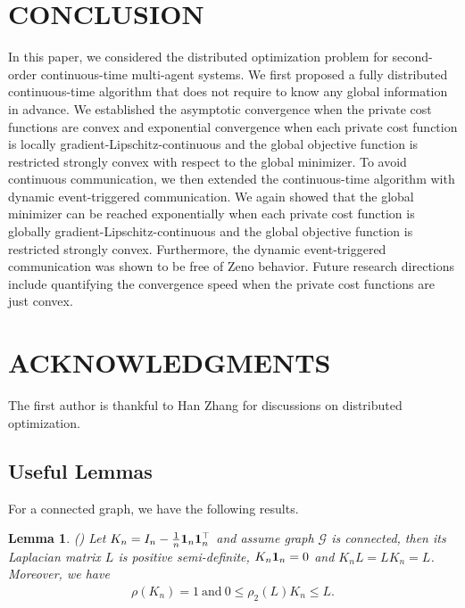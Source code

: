 \documentclass[letterpaper, 10 pt, conference]{ieeeconf}  %
\newtheorem{lemma}{Lemma}
\begin{document}
\section{CONCLUSION}\label{cdc18so:sec:conclusion}
In this paper, we considered the distributed optimization problem for second-order continuous-time multi-agent systems.
We first proposed a fully distributed continuous-time algorithm that does not require to know any global information in advance. %
We established the asymptotic convergence when the private cost functions are convex and exponential convergence when each private cost function is locally  gradient-Lipschitz-continuous and the global objective function is restricted strongly convex  with respect to the global minimizer.
To avoid continuous communication, we then extended the continuous-time algorithm with dynamic event-triggered communication.
We again showed that the global minimizer can be reached exponentially when each private cost function is globally gradient-Lipschitz-continuous and the global objective function is restricted strongly convex.  Furthermore, the dynamic event-triggered communication was shown to be free of Zeno behavior.
Future research directions include quantifying the convergence speed when the private cost functions are just convex.

\section*{ACKNOWLEDGMENTS}
The first author is thankful to Han Zhang for discussions on distributed optimization.




\appendix

\subsection{Useful Lemmas}\label{cdc18so:lemmaandproof}

For a connected graph, we have the following results.
\begin{lemma}\label{cdc18so:lemma:LKn}
(\cite[Lemma 2.1]{yi2017formation}) Let $K_n=I_n-\frac{1}{n}{\bf 1}_n{\bf 1}^{\top}_n$ and assume graph $\mathcal G$ is connected, then its Laplacian matrix $L$ is positive semi-definite, $K_n{\bf 1}_n=0$ and $K_nL=LK_n=L$. Moreover, we have
\begin{align}\label{cdc18so:lemma:LKneq}
\rho(K_n)=1~\text{and}~0\le\rho_2(L)K_n\le L.
\end{align}
\end{lemma}
\end{document}
